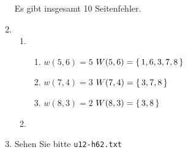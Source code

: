 \begin{enumerate}[label={Aufgabe H\arabic*},start=60]
        Es gibt insgesamt 10 Seitenfehler.
    \item 
        \begin{enumerate}
            \item 
                \begin{enumerate}[label={(\roman*)}]
                    \item $w(5,6) = 5$ \hspace{1cm} $W(5,6) = \left\{\,1, 6, 3, 7, 8\,\right\}$ 
                    \item $w(7,4) = 3$ \hspace{1cm} $W(7,4) = \left\{\,3, 7, 8\,\right\}$
                    \item $w(8,3) = 2$ \hspace{1cm} $W(8,3) = \left\{\,3, 8\,\right\}$
                \end{enumerate}
            \item 
        \end{enumerate}
    \item Sehen Sie bitte \texttt{u12-h62.txt}
\end{enumerate}